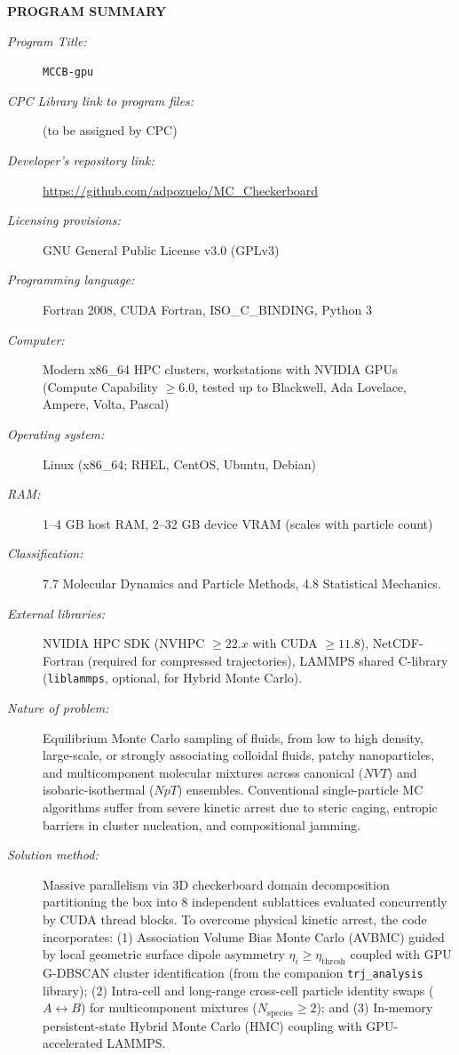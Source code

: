 \documentclass[final,5p,times,twocolumn]{elsarticle}
\begin{document}
\noindent
{\small
\textbf{PROGRAM SUMMARY}
\begin{description}
  \item[\textit{Program Title:}] \texttt{MCCB-gpu}
  \item[\textit{CPC Library link to program files:}] (to be assigned by CPC)
  \item[\textit{Developer's repository link:}] \url{https://github.com/adpozuelo/MC_Checkerboard}
  \item[\textit{Licensing provisions:}] GNU General Public License v3.0 (GPLv3)
  \item[\textit{Programming language:}] Fortran 2008, CUDA Fortran, ISO\_C\_BINDING, Python 3
  \item[\textit{Computer:}] Modern x86\_64 HPC clusters, workstations with NVIDIA GPUs (Compute Capability $\ge 6.0$, tested up to Blackwell, Ada Lovelace, Ampere, Volta, Pascal)
  \item[\textit{Operating system:}] Linux (x86\_64; RHEL, CentOS, Ubuntu, Debian)
  \item[\textit{RAM:}] 1--4 GB host RAM, 2--32 GB device VRAM (scales with particle count)
  \item[\textit{Classification:}] 7.7 Molecular Dynamics and Particle Methods, 4.8 Statistical Mechanics.
  \item[\textit{External libraries:}] NVIDIA HPC SDK (NVHPC $\ge 22.x$ with CUDA $\ge 11.8$), NetCDF-Fortran (required for compressed trajectories), LAMMPS shared C-library (\texttt{liblammps}, optional, for Hybrid Monte Carlo).
  \item[\textit{Nature of problem:}] Equilibrium Monte Carlo sampling
    of fluids, from low to high density, large-scale, or strongly associating colloidal fluids,
    patchy nanoparticles, and multicomponent molecular mixtures across
    canonical ($NVT$) and isobaric-isothermal ($NpT$)
    ensembles. Conventional single-particle MC algorithms suffer from
    severe kinetic arrest due to steric caging, entropic barriers in
    cluster nucleation, and compositional jamming. 
  \item[\textit{Solution method:}] Massive parallelism via 3D
    checkerboard domain decomposition partitioning the box into 8
    independent sublattices evaluated concurrently by CUDA thread
    blocks. To overcome physical kinetic arrest, the code
    incorporates: (1) Association Volume Bias Monte Carlo (AVBMC)
    guided by local geometric surface dipole asymmetry $\eta_i \ge
    \eta_{\text{thresh}}$ coupled with GPU G-DBSCAN cluster
    identification (from the companion \texttt{trj\_analysis}
    library); (2) Intra-cell and long-range cross-cell particle
    identity swaps ($A \leftrightarrow B$) for multicomponent mixtures
    ($N_{\text{species}} \ge 2$); and (3) In-memory persistent-state
    Hybrid Monte Carlo (HMC) coupling with GPU-accelerated
    LAMMPS.


\end{description}}
\end{document}

